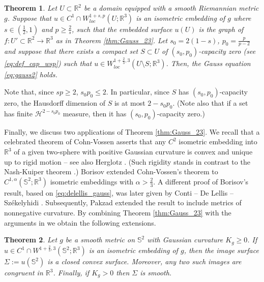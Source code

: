 \documentclass[12pt]{article}
\newcommand{\R}{\mathbb{R}}
\theoremstyle{plain}
\newtheorem{theorem}{Theorem}[section]
\numberwithin{equation}{section}
\begin{document}
\begin{theorem} \label{thm:capacity}
Let $U \subset \R^2$ be a domain equipped with a smooth Riemannian metric $g$. Suppose that $u\in C^1 \cap W^{1+s,p}_{loc}(U;\R^3)$ is an isometric embedding of $g$ where $s \in (\frac12,1)$ and $p \geq \frac2s$, such that the embedded surface $u(U)$ is the graph of $f : U' \subset \R^2 \to \R^3$ as in Theorem \ref{thm:Gauss_23}. Let $s_0 = 2(1-s)$, $p_0 = \frac{p}{p-2}$ and suppose that there exists a compact set $S \subset U$ of $(s_0,p_0)$-capacity zero (see \eqref{eq:def_cap_wsp}) such that $u \in W^{1+\frac23,3}_{{loc}}(U \setminus S; \R^3)$. Then, the Gauss equation \eqref{eq:gauss2} holds.
\end{theorem}

Note that, since $sp \geq 2$, $s_0p_0 \leq 2$. In particular, since $S$ has $(s_0,p_0)$-capacity zero, the Hausdorff dimension of $S$ is at most $2 - s_0p_0$. (Note also that  if a set has finite $\mathcal{H}^{2-s_0p_0}$ measure, then it has $(s_0,p_0)$-capacity zero.)

Finally, we discuss two applications of Theorem \ref{thm:Gauss_23}. We recall that a celebrated theorem of Cohn-Vossen \cite{cohn_vossen} asserts that any $C^2$ isometric embedding into $\R^3$ of a given two-sphere with positive Gaussian curvature is convex and unique up to rigid motion -- see also Herglotz \cite{herglotz}. (Such rigidity stands in contrast to the Nash-Kuiper theorem \cite{nash_54, kuiper_55}.) Borisov \cite{borisov_I, borisov_II, borisov_59, borisov_III, borisov_60} extended Cohn-Vossen's theorem to $C^{1,\alpha}(\mathbb{S}^2;\R^3)$ isometric embeddings with $\alpha > \frac23$. A different proof of Borisov's result, based on \eqref{eq:delellis_gauss}, was later given by Conti -- De Lellis -- Székelyhidi \cite{conti_deLellis_szekelyhidi_12}. Subsequently, Pakzad \cite{pakzad_24} extended the result to include metrics of nonnegative curvature. By combining Theorem \ref{thm:Gauss_23} with the arguments in \cite{conti_deLellis_szekelyhidi_12, pakzad_24} we obtain the following extensions.

\begin{theorem} \label{thm:rigidity_closed}
    Let $g$ be a smooth metric on $\mathbb{S}^2$ with Gaussian curvature $K_g \geq 0$. If $u \in C^1 \cap W^{1+\frac23,3}(\mathbb{S}^2;\R^3)$ is an isometric embedding of $g$, then the image surface $\Sigma := u(\mathbb{S}^2)$ is a closed convex surface. Moreover, any two such images are congruent in $\R^3$. Finally, if $K_g > 0$ then $\Sigma$ is smooth.
\end{theorem}
\end{document}
